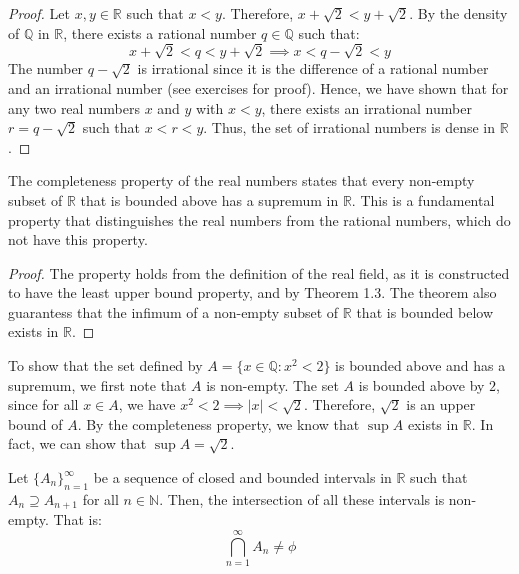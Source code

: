 \documentclass[openany]{book}
\begin{document}
\begin{proof}
Let $x, y \in \mathbb{R}$ such that $x < y$. Therefore, $x + \sqrt{2} < y + \sqrt{2}$. By the density of $\mathbb{Q}$ in $\mathbb{R}$, there exists a rational number $q \in \mathbb{Q}$ such that: 
$$x + \sqrt{2} < q < y + \sqrt{2} \implies x < q - \sqrt{2} < y$$
The number $q - \sqrt{2}$ is irrational since it is the difference of a rational number and an irrational number (see exercises for proof). Hence, we have shown that for any two real numbers $x$ and $y$ with $x < y$, there exists an irrational number $r = q - \sqrt{2}$ such that $x < r < y$. Thus, the set of irrational numbers is dense in $\mathbb{R}$.
\end{proof} 
\begin{mytheorem}
The completeness property of the real numbers states that every non-empty subset of $\mathbb{R}$ that is bounded above has a supremum in $\mathbb{R}$. This is a fundamental property that distinguishes the real numbers from the rational numbers, which do not have this property. 
\end{mytheorem}
\begin{proof}
The property holds from the definition of the real field, as it is constructed to have the least upper bound property, and by Theorem 1.3. The theorem also guarantess that the infimum of a non-empty subset of $\mathbb{R}$ that is bounded below exists in $\mathbb{R}$.
\end{proof}
\begin{example}
To show that the set defined by $A = \{x \in \mathbb{Q}: x^2 < 2\}$ is bounded above and has a supremum, we first note that $A$ is non-empty. The set $A$ is bounded above by $2$, since for all $x \in A$, we have $x^2 < 2 \implies |x| < \sqrt{2}$. Therefore, $\sqrt{2}$ is an upper bound of $A$. By the completeness property, we know that $\sup A$ exists in $\mathbb{R}$. In fact, we can show that $\sup A = \sqrt{2}$.
\end{example}
\begin{mytheorem}
Let $\{A_n\}_{n=1}^{\infty}$ be a sequence of closed and bounded intervals in $\mathbb{R}$ such that $A_n \supseteq A_{n+1}$ for all $n \in \mathbb{N}$. Then, the intersection of all these intervals is non-empty. That is:
$$\bigcap_{n=1}^{\infty} A_n \neq \phi$$
\end{mytheorem}
\end{document}
